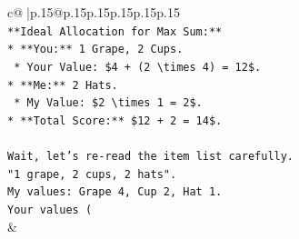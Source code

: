 \documentclass{article}
\begin{document}
{\begin{supertabular}{c@{$\;$}|p{.15\linewidth}@{}p{.15\linewidth}p{.15\linewidth}p{.15\linewidth}p{.15\linewidth}p{.15\linewidth}}
{{{\\ 
\texttt{**Ideal Allocation for Max Sum:**} \\
\texttt{*   **You:** 1 Grape, 2 Cups.} \\
\texttt{    *   Your Value: \$4 + (2 \textbackslash{}times 4) = 12\$.} \\
\texttt{*   **Me:** 2 Hats.} \\
\texttt{    *   My Value: \$2 \textbackslash{}times 1 = 2\$.} \\
\texttt{*   **Total Score:** \$12 + 2 = 14\$.} \\
\\ 
\texttt{Wait, let's re{-}read the item list carefully.} \\
\texttt{"1 grape, 2 cups, 2 hats".} \\
\texttt{My values: Grape 4, Cup 2, Hat 1.} \\
\texttt{Your values (} \\
            }
        }
    }
    & \\ \\


\end{supertabular}}
\end{document}
